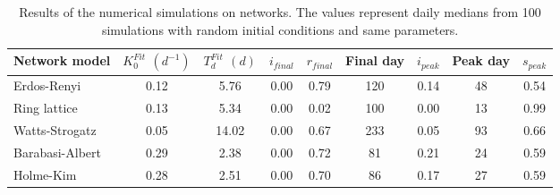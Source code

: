\begin{table}[h]
\centering
\caption{Results of the numerical simulations on networks. The values represent daily medians from 100 simulations with random initial conditions and same parameters.}
\label{tab:results}
\begin{tabular}{lcccccccc}
\toprule
   Network model & $K_0^{Fit}$ $(d^{-1})$ & $T_d^{Fit}$ $(d)$ & $i_{final}$ & $r_{final}$ & Final day & $i_{peak}$  & Peak day & $s_{peak}$\\
\midrule
 Erdos-Renyi 			&    0.12 &   5.76 &  0.00 &  0.79 &    120 &  0.14 &   48 & 0.54 \\
 Ring lattice 		&    0.13 &   5.34 &  0.00 &  0.02 &  	100 &  0.00 &   13 & 0.99 \\
 Watts-Strogatz 	&    0.05 &  14.02 &  0.00 &  0.67 &    233 &  0.05 &   93 & 0.66 \\
 Barabasi-Albert 	&    0.29 &   2.38 &  0.00 &  0.72 &  	 81 &  0.21 &   24 & 0.59 \\
 Holme-Kim 				&    0.28 &   2.51 &  0.00 &  0.70 &  	 86 &  0.17 &   27 & 0.59 \\

 
\bottomrule
\end{tabular}
\end{table}
